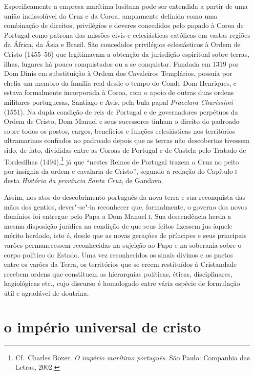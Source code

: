 Especificamente a empresa marítima lusitana pode ser entendida a partir
de uma união indissolúvel da Cruz e da Coroa, amplamente definida como
uma combinação de direitos, privilégios e deveres concedidos pelo
papado à Coroa de Portugal como patrona das missões civis e
eclesiásticas católicas em vastas regiões da África, da Ásia e Brasil.
São concedidos privilégios eclesiásticos à Ordem de Cristo (1455--56)
que legitimavam a obtenção da jurisdição espiritual sobre terras,
ilhas, lugares há pouco conquistados ou a se conquistar. Fundada em
1319 por Dom Dinis em substituição à Ordem dos Cavaleiros Templários,
possuía por chefia um membro da família real desde o tempo do Conde Dom
Henriques, e estava formalmente incorporada à Coroa, com o apoio de
outras duas ordens militares portuguesas, Santiago e Avis, pela bula
papal \textit{Praeclara Charissimi} (1551). Na dupla condição de reis de
Portugal e de governadores perpétuos da Ordem de Cristo, Dom Manuel e
seus sucessores tinham o direito do padroado sobre todos os postos,
cargos, benefícios e funções eclesiásticas nos territórios ultramarinos
confiados ao padroado depois que as terras não descobertas tivessem
sido, de fato, divididas entre as Coroas de Portugal e de Castela pelo
Tratado de Tordesilhas (1494),\footnote{ Cf.~Charles Boxer. \textit{O império
marítimo português}. São Paulo: Companhia das Letras, 2002.} já que
``nestes Reinos de Portugal trazem a Cruz no peito por
insígnia da ordem e cavalaria de Cristo'', segundo a
redação do Capítulo \textsc{i} desta \textit{História da província Santa Cruz}, de Gandavo.

Assim, nos atos do descobrimento português da nova terra e sua
reconquista das mãos dos gentios, dever"-se"-ia reconhecer que,
formalmente, o governo dos novos domínios foi entregue pelo Papa a Dom
Manuel \textsc{i}. Sua descendência herda a mesma disposição jurídica na
condição de que seus feitos fizessem jus àquele mérito herdado, isto é,
desde que as novas gerações de príncipes e seus principais varões
permanecessem reconhecidas na sujeição ao Papa e na soberania sobre o
corpo político do Estado. Uma vez reconhecidos os sinais divinos e os
pactos entre os varões da Terra, os territórios que se creem
restituídos à Cristandade recebem ordens que constituem as hierarquias
políticas, éticas, disciplinares, hagiológicas etc., cujo discurso é
homologado entre vária espécie de formulação útil e agradável de doutrina. 

\section{o império universal de cristo}

